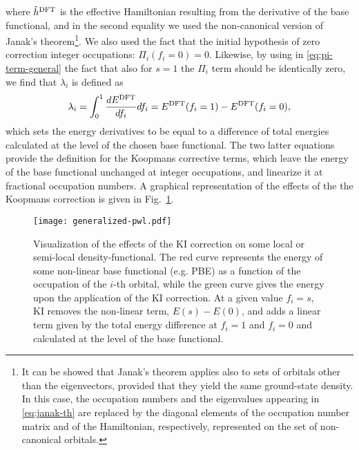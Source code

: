 %
where $\hat{h}^{\rm DFT}$ is the effective Hamiltonian resulting from the derivative of the base functional, and in the second equality we used the non-canonical version of Janak's theorem\footnote{It can be showed that Janak's theorem applies also to sets of orbitals other than the eigenvectors, provided that they yield the same ground-state density. In this case, the occupation numbers and the eigenvalues appearing in \cref{eq:janak-th} are replaced by the diagonal elements of the occupation number matrix and of the Hamiltonian, respectively, represented on the set of non-canonical orbitals.}. We also used the fact that the initial hypothesis of zero correction integer occupations: $\Pi_i(f_i=0) = 0$. Likewise, by using in \cref{eq:pi-term-general} the fact that also for $s=1$ the $\Pi_i$ term should be identically zero, we find that $\lambda_i$ is defined as
%
\begin{equation}
    \lambda_i = \int_0^{1} \frac{dE^{\rm DFT}}{df_i} df_i = E^{\rm DFT}(f_i=1) - E^{\rm DFT}(f_i=0) ,
    \label{eq:lambda-definition}
\end{equation}
%
which sets the energy derivatives to be equal to a difference of total energies calculated at the level of the chosen base functional. The two latter equations provide the definition for the Koopmans corrective terms, which leave the energy of the base functional unchanged at integer occupations, and linearize it at fractional occupation numbers. A graphical representation of the effects of the the Koopmans correction is given in Fig.~\ref{fig:kc-correction-visual}.

\begin{figure}
    \centering
    \texttt{[image: generalized-pwl.pdf]}
    \caption[Graphical representation of the KI correction.]{Visualization of the effects of the KI correction on some local or semi-local density-functional. The red curve represents the energy of some non-linear base functional (e.g. PBE) as a function of the occupation of the $i$-th orbital, while the green curve gives the energy upon the application of the KI correction. At a given value $f_i=s$, KI removes the non-linear term, $E(s)-E(0)$, and adds a linear term given by the total energy difference at $f_i=1$ and $f_i=0$ and calculated at the level of the base functional.}
    \label{fig:kc-correction-visual}
\end{figure}

